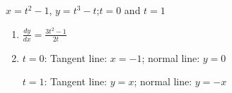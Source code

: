 {$x=t^2-1$, $y=t^3-t$;\quad $t=0$ and $t=1$}
{\begin{enumerate}
	\item $\frac{dy}{dx} = \frac{3t^2-1}{2 t}$
	\item	$t=0$: Tangent line: $x=-1$; normal line: $y = 0$
	
	$t=1$: Tangent line: $y=x$; normal line: $y=-x$
\end{enumerate}
}
